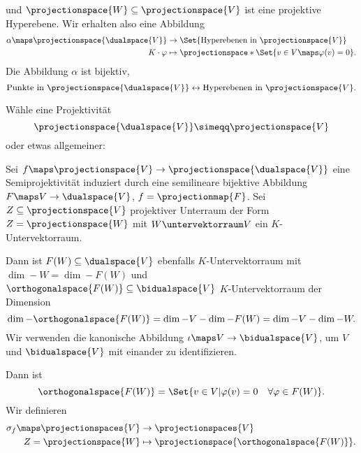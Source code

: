 und \( \projectionspace{W}\subseteq \projectionspace{V} \) ist eine projektive Hyperebene. Wir erhalten also eine Abbildung
\begin{equation*}
  \begin{split}
    \alpha\maps \projectionspace{\dualspace{V}}&\to \Set{\text{Hyperebenen in \( \projectionspace{V} \)}}\\
    K\cdot \varphi&\mapsto \projectionspace*{\Set{v\in V\maps \varphi(v)=0}}.
  \end{split}
\end{equation*}
Die Abbildung \( \alpha \) ist bijektiv, \dh
\begin{equation*}
  \text{Punkte in \( \projectionspace{\dualspace{V}} \)}\leftrightarrow \text{Hyperebenen in \( \projectionspace{V} \)}.
\end{equation*}
\begin{idee*}
  Wähle eine Projektivität
  \begin{equation*}
    \projectionspace{\dualspace{V}}\simeqq \projectionspace{V}
  \end{equation*}
  oder etwas allgemeiner:
  
  Sei \( f\maps \projectionspace{V}\to \projectionspace{\dualspace{V}} \) eine Semiprojektivität induziert durch eine semilineare bijektive Abbildung \( F\maps V\to \dualspace{V} \), \dh \( f=\projectionmap{F} \). Sei \( Z\subseteq \projectionspace{V} \) projektiver Unterraum der Form \( Z=\projectionspace{W} \) mit \( W\untervektorraum V \) ein \( K \)-Untervektorraum.

  Dann ist \( F(W)\subseteq \dualspace{V} \) ebenfalls \( K \)-Untervektorraum mit \( \dim-{W}=\dim-{F(W)} \) und \( \orthogonalspace{F(W)}\subseteq \bidualspace{V} \) \( K \)-Untervektorraum der Dimension
  \begin{equation*}
    \dim-{\orthogonalspace{F(W)}}=\dim-{V}-\dim-{F(W)}=\dim-{V}-\dim-{W}.
  \end{equation*}
  Wir verwenden die kanonische Abbildung \( \iota\maps V\to \bidualspace{V} \), um \( V \) und \( \bidualspace{V} \) mit einander zu identifizieren.

  Dann ist 
  \begin{equation*}
    \orthogonalspace{F(W)}=\Set{v\in V|\varphi(v)=0\quad \forall \varphi\in F(W)}.
  \end{equation*}
  Wir definieren
  \begin{equation*}
    \begin{split}
      \sigma_f\maps \projectionspaces{V}&\to\projectionspaces{V}\\
      Z=\projectionspace{W}&\mapsto \projectionspace{\orthogonalspace{F(W)}}.
    \end{split}
  \end{equation*}
\end{idee*}
